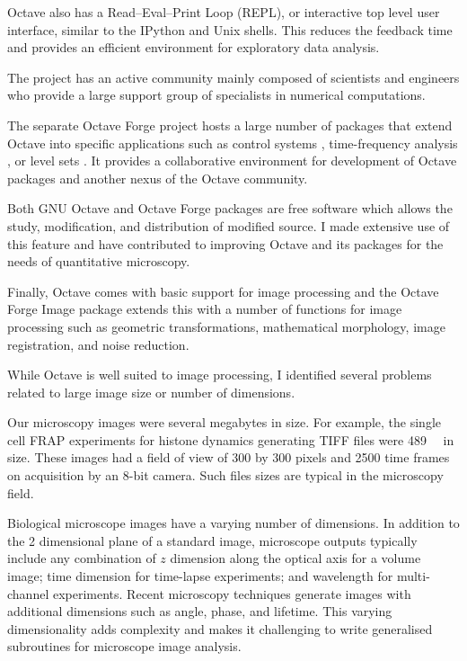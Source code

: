 Octave also has a Read--Eval--Print Loop (REPL), or interactive top
level user interface, similar to the IPython and Unix shells.  This reduces the
feedback time and provides an efficient
environment for exploratory data analysis.

The project has an active community
mainly composed of
scientists and engineers who provide a large support group of
specialists in numerical computations.

The separate Octave Forge project hosts a large number of
packages that extend Octave into specific applications such as control
systems \citep{octave-control}, time-frequency analysis
\citep{octave-ltfat}, or level sets \citep{octave-level-set}.
It provides a collaborative environment for development of Octave
packages and another nexus of the Octave community.

Both GNU Octave and Octave Forge packages are free software which allows
the study, modification, and distribution of modified source.
I made extensive
use of this feature and have contributed to improving Octave and its
packages for the needs of quantitative microscopy.

Finally, Octave comes with basic support for image processing and the
Octave Forge Image package extends this with a number of functions for
image processing such as geometric transformations, mathematical
morphology, image registration, and noise reduction.

While Octave is well suited to image
processing, I identified several problems related to
large image size or number of dimensions.

Our microscopy images
were several megabytes in size.  For example, the single cell
FRAP experiments for histone dynamics generating
TIFF files were \SI{489}{\mebi\byte} in size.
These images had a field of view of 300
by 300 pixels and 2500 time frames
on acquisition by an 8-bit camera.
Such files sizes are typical in the microscopy field.

Biological microscope images have a varying number of dimensions.
In addition to the 2 dimensional plane of a standard image, microscope
outputs typically include any combination of $z$ dimension along
the optical axis for a volume image; time dimension for time-lapse
experiments; and wavelength for multi-channel experiments.  Recent microscopy
techniques generate images with additional dimensions
such as angle, phase, and lifetime.  This varying dimensionality adds
complexity and makes it challenging to write generalised subroutines for
microscope image analysis.

